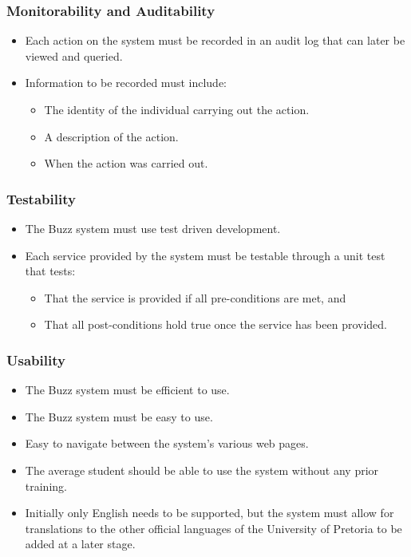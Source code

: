 \documentclass[12pt, oneside]{article}
\begin{document}
		\subsubsection{Monitorability and Auditability}
			\begin{itemize}
				\item Each action on the system must be recorded in an audit log that can later be viewed and queried.
				\item Information to be recorded must include:
				\begin{itemize}
					\item The identity of the individual carrying out the action.
					\item A description of the action.
					\item When the action was carried out.
				\end{itemize}
			\end{itemize}
		\subsubsection{Testability}
			\begin{itemize}
				\item The Buzz system must use test driven development.
				\item Each service provided by the system must be testable through a unit test that tests:
				\begin{itemize}
					\item That the service is provided if all pre-conditions are met, and
					\item That all post-conditions hold true once the service has been provided.
				\end{itemize}
			\end{itemize}
		\subsubsection{Usability}
			\begin{itemize}
				\item The Buzz system must be efficient to use.
				\item The Buzz system must be easy to use.
				\item Easy to navigate between the system's various web pages.
				\item The average student should be able to use the system without any prior training.
				\item Initially only English needs to be supported, but the system must allow for translations to the other official languages of the University of Pretoria to be added at a later stage.
			\end{itemize}
\end{document}
